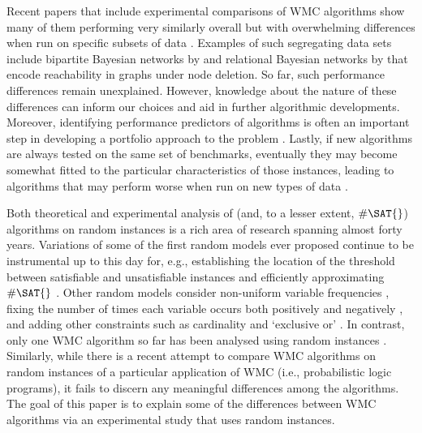 Recent papers that include experimental comparisons of \textsf{WMC}
algorithms show many of them performing very similarly
overall \citep{DBLP:conf/aaai/DudekPV20,DBLP:conf/cp/DudekPV20} but with
overwhelming differences when run on specific subsets of
data \citep{DBLP:conf/uai/DilkasB21,DBLP:conf/sat/DilkasB21,DBLP:conf/ijcai/LagniezM17}.
Examples of such segregating data sets include bipartite Bayesian networks by
\citet{DBLP:conf/aaai/SangBK05} and
relational Bayesian networks by
\citet{DBLP:journals/ijar/ChaviraDJ06}
that encode reachability in graphs under node deletion. So far, such performance
differences remain unexplained. However, knowledge about the nature of these
differences can inform our choices and aid in further algorithmic developments.
Moreover, identifying performance predictors of algorithms is often an important
step in developing a portfolio approach to the
problem \citep{DBLP:journals/jair/XuHHL08}. Lastly, if new algorithms are always
tested on the same set of benchmarks, eventually they may become somewhat fitted
to the particular characteristics of those instances, leading to algorithms that
may perform worse when run on new types of
data \citep{DBLP:conf/cec/HossainALA10}.

Both theoretical and experimental analysis of \SAT{} (and, to a lesser extent,
$\#\SAT{}$) algorithms on random instances is a rich area of research spanning
almost forty years. Variations of some of the first random models ever
proposed \citep{DBLP:journals/dam/FrancoP83,DBLP:journals/siamcomp/PurdomB83}
continue to be instrumental up to this day for, e.g., establishing the location
of the threshold between satisfiable and unsatisfiable
instances \citep{DBLP:conf/focs/AchlioptasM02} and efficiently approximating
$\#\SAT{}$ \citep{DBLP:conf/icalp/GalanisG0Y20}. Other random models consider
non-uniform variable frequencies \citep{DBLP:conf/ijcai/AnsoteguiBL09}, fixing
the number of times each variable occurs both positively and
negatively \citep{DBLP:journals/cpc/Coja-OghlanW18}, and adding other constraints
such as cardinality and `exclusive or' \citep{DBLP:conf/ijcai/PoteJM19}. In
contrast, only one \textsf{WMC} algorithm so far has been analysed using random
instances \citep{DBLP:conf/sat/SangBBKP04,DBLP:conf/sat/SangBK05}. Similarly,
while there is a recent attempt \citep{DBLP:conf/cp/DilkasB20} to compare
\textsf{WMC} algorithms on random instances of a particular application of
\textsf{WMC} (i.e., probabilistic logic programs), it fails to discern any
meaningful differences among the algorithms. The goal of this paper is to
explain some of the differences between \textsf{WMC} algorithms via an
experimental study that uses random instances.

